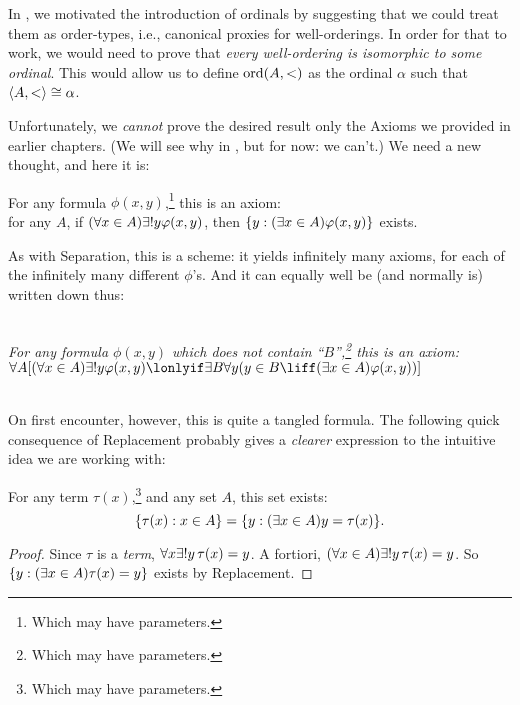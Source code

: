 \documentclass[../../../include/open-logic-section]{subfiles}
\begin{document}

In , we motivated the introduction of ordinals by
suggesting that we could treat them as order-types, i.e., canonical
proxies for well-orderings. In order for that to work, we would need
to prove that \emph{every well-ordering is isomorphic to some
ordinal}. This would allow us to define $\mathrm{ord}(A, <)$ as the
ordinal $\alpha$ such that $\langle A, < \rangle \cong \alpha$. 

Unfortunately, we \emph{cannot} prove the desired result only the
Axioms we provided in earlier chapters. (We will see why in
, but for now: we can't.) We need a
new thought, and here it is:

\begin{axiom}
For any formula $\phi(x, y)$,\footnote{Which may have parameters.} this is an axiom: 
	\\for any $A$, if $(\forall x \in A)\exists\bang y\phi(x,y)$, {then} $\{ y : (\exists x \in A)\varphi(x,y) \}$ exists.
\end{axiom}

As with Separation, this is a scheme: it yields infinitely many
axioms, for each of the infinitely many different $\phi$'s. And it can
equally well be (and normally is) written down thus:

\
\\\emph{For any formula $\phi(x,y)$ which does not contain ``$B$'',\footnote{Which may have parameters.} this is an axiom:
\\$\forall A[(\forall x \in A)\exists \bang y \phi(x,y) \lonlyif \exists B\forall y (y \in B \liff (\exists x \in A)\phi(x,y))]$}

\
\\ 
On first encounter, however, this is quite a tangled formula. The
following quick consequence of Replacement probably gives a
\emph{clearer} expression to the intuitive idea we are working with:

\begin{cor}
For any term $\tau(x)$,\footnote{Which may have parameters.} and any set $A$, this set exists:
\[
	\{ \tau(x) : x \in A \} = \{ y : (\exists x \in A)y = \tau(x) \}.
\]
\end{cor}

\begin{proof}
Since $\tau$ is a \emph{term}, $\forall x \exists \bang y\,  \tau(x) =
y$. A fortiori, $(\forall x \in A)\exists\bang y\, \tau(x) = y$. So
$\{ y : (\exists x \in A)\tau(x) = y \}$ exists by Replacement.
\end{proof}
\end{document}
